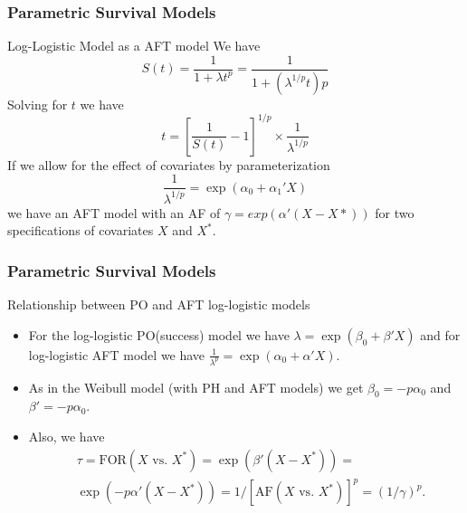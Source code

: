 \documentclass{beamer}
\theoremstyle{definition}
\begin{document}
\begin{frame}
\frametitle{Parametric Survival Models}
\begin{block}{Log-Logistic Model as a AFT model}
We have
\[
S(t) = \frac{1}{1 + \lambda t^p} = \frac{1}{1 + \left(\lambda^{1/p}t\right)p}
\]
Solving for $t$ we have
\[
t = \left[\frac{1}{S(t)} - 1 \right]^{1/p} \times \frac{1}{\lambda^{1/p}}
\]
If we allow for the effect of covariates by parameterization 
\[
\frac{1}{\lambda^{1/p}} = \exp(\alpha_0 + \alpha_1' X)
\]
we have an AFT model with an AF of $\gamma=exp(\alpha'(X-X*))$ for two specifications of covariates $X$ and $X^*$.  
\end{block}
\end{frame}

\begin{frame}
\frametitle{Parametric Survival Models}
\begin{block}{Relationship between PO and AFT log-logistic models}
\begin{itemize}
\item For the log-logistic PO(success) model we have $\lambda = \exp(\beta_0 + \beta'X)$ and for log-logistic AFT model we have $\frac{1}{\lambda^p} = \exp(\alpha_0 + \alpha'X)$.
\item As in the Weibull model (with PH and AFT models) we get  $\beta_0 = -p \alpha_0$ and $\beta' = -p \alpha_0$. 
\item Also, we have 
\begin{align*}
& \tau = \text{FOR}(X \text{ vs. } X^*) = \exp(\beta'(X - X^*)) =\\
&\exp(-p\alpha'(X - X^*)) = 1/[\text{AF}(X \text{ vs. } X^*)]^p = (1/\gamma)^p.
\end{align*}
\end{itemize} 
\end{block}
\end{frame}
\end{document}
